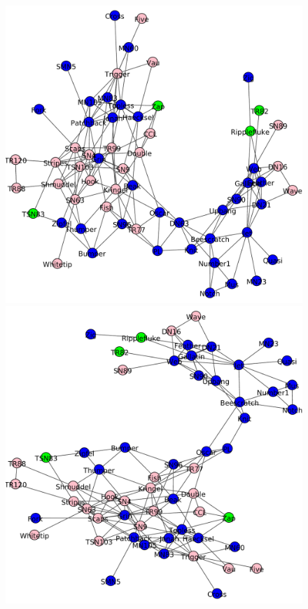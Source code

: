 \begin{figure}
\centering
\includegraphics[scale = 0.28]{figuras/Parte_c0-eps-converted-to.pdf} 
\includegraphics[scale = 0.28]{figuras/Parte_c1-eps-converted-to.pdf} \\

\end{figure}
